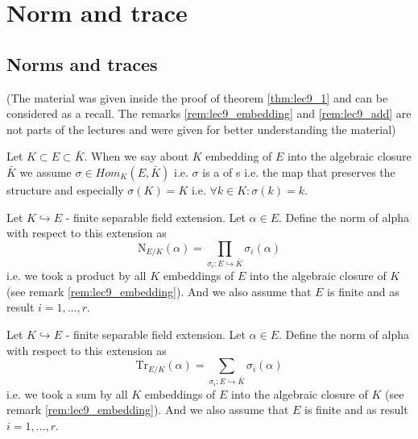 \section{Norm and trace}

\subsection{Norms and traces}
(The material was given inside the proof of theorem \ref{thm:lec9_1}
and can be considered as a recall. The remarks
\ref{rem:lec9_embedding} and \ref{rem:lec9_add} are not parts of the
lectures and were given for better understanding the material)

\begin{remark}
  Let $K \subset E \subset \bar{K}$. When we say about $K$ embedding
  of $E$ into the algebraic closure $\bar{K}$ we assume
  $\sigma \in Hom_K\left(E, \bar{K}\right)$ i.e. $\sigma$ is a
   of s i.e. the map
  that preserves the structure and especially $\sigma(K) = K$ i.e.
  $\forall k \in K: \sigma(k) = k$.
  \label{rem:lec9_embedding}
\end{remark}

\begin{definition}[Norm]
  Let $K \hookrightarrow E$ - finite separable field extension. Let $\alpha \in
  E$.   Define the norm of alpha with respect to this extension as
  \[
  \mathrm {N}_{E/K}\left(\alpha\right) =
  \prod_{\sigma_i: E \hookrightarrow \bar{K}} \sigma_i\left(\alpha\right)
  \]
  i.e. we took a product by all $K$ embeddings of $E$ into the
  algebraic closure of $K$ (see remark \ref{rem:lec9_embedding}).
  And we also assume that $E$ is
  finite and as result $i = 1, \dots, r$.
  \label{def:norm}
\end{definition}

\begin{definition}[Trace]
  Let $K \hookrightarrow E$ - finite separable field extension. Let $\alpha \in
  E$.   Define the norm of alpha with respect to this extension as
  \[
  \mathrm {Tr}_{E/K}\left(\alpha\right) =
  \sum_{\sigma_i: E \hookrightarrow \bar{K}} \sigma_i\left(\alpha\right)
  \]
  i.e. we took a sum by all $K$ embeddings of $E$ into the
  algebraic closure of $K$ (see remark \ref{rem:lec9_embedding}). And
  we also assume that $E$ is finite and as result $i = 1, \dots, r$. 
  \label{def:trace}
\end{definition}

